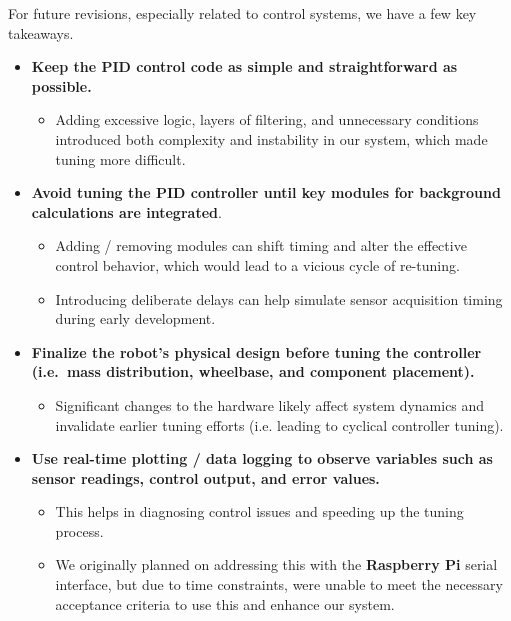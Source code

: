 \documentclass{article}
\begin{document}
\begin{minipage}{\linewidth}
    For future revisions, especially related to control systems, we have a few key takeaways.
        \begin{itemize}
            \item \textbf{Keep the PID control code as simple and straightforward as possible.}
                \begin{itemize}
                    \item Adding excessive logic, layers of filtering, and unnecessary conditions introduced both complexity and instability in our system, which made tuning more difficult.
                \end{itemize}

            \item \textbf{Avoid tuning the PID controller until key modules for background calculations are integrated}.
                \begin{itemize}
                    \item Adding / removing modules can shift timing and alter the effective control behavior, which would lead to a vicious cycle of re-tuning.
                    \item Introducing deliberate delays can help simulate sensor acquisition timing during early development.
                \end{itemize}

            \item \textbf{Finalize the robot's physical design before tuning the controller (i.e.~mass distribution, wheelbase, and component placement).}
                \begin{itemize}
                    \item Significant changes to the hardware likely affect system dynamics and invalidate earlier tuning efforts (i.e. leading to cyclical controller tuning).
                \end{itemize}

            \item \textbf{Use real-time plotting / data logging to observe variables such as sensor readings, control output, and error values.}
                \begin{itemize}
                    \item This helps in diagnosing control issues and speeding up the tuning process.
                    \item We originally planned on addressing this with the \textbf{Raspberry Pi} serial interface, but due to time constraints, were unable to meet the necessary acceptance criteria to use this and enhance our system.
                \end{itemize}


\end{itemize}
\end{minipage}
\end{document}
